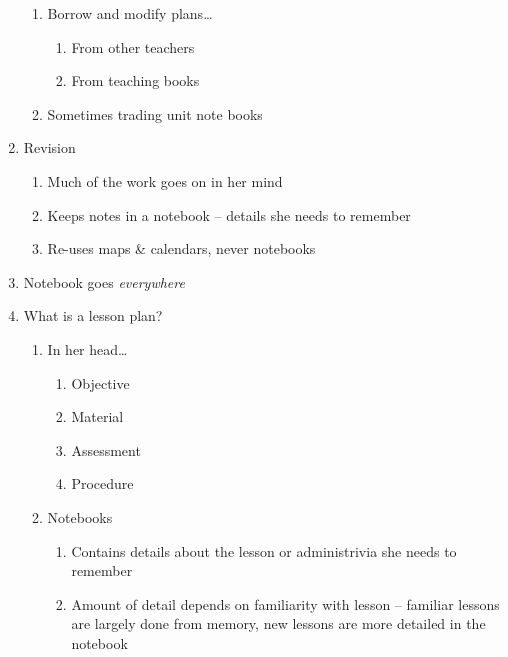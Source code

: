 \documentclass[11pt,letter]{article}
\begin{document}
\begin{enumerate}
\begin{enumerate}
			\item Borrow and modify plans\ldots
				\begin{enumerate}
					\item From other teachers

					\item From teaching books

				\end{enumerate}

			\item Sometimes trading unit note books

		\end{enumerate}

	\item Revision
		\begin{enumerate}
			\item Much of the work goes on in her mind

			\item Keeps notes in a notebook -- details she needs to remember

			\item Re-uses maps \& calendars, never notebooks

		\end{enumerate}

	\item Notebook goes \textit{everywhere}

	\item What is a lesson plan?
		\begin{enumerate}
			\item In her head\ldots
				\begin{enumerate}
					\item Objective

					\item Material

					\item Assessment

					\item Procedure

				\end{enumerate}

			\item Notebooks
				\begin{enumerate}
					\item Contains details about the lesson or administrivia she
						needs to remember

					\item Amount of detail depends on familiarity with lesson --
						familiar lessons are largely done from memory, new
						lessons are more detailed in the notebook

				\end{enumerate}

		\end{enumerate}

\end{enumerate}
\end{document}
